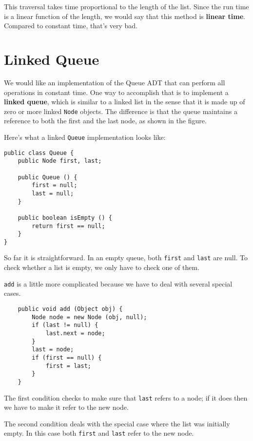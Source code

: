This traversal takes time proportional to the length of the
list.  Since the run time is a linear function of the length,
we would say that this method is {\bf linear time}.  Compared to
constant time, that's very bad. 



\section{Linked Queue}

We would like an implementation of the Queue ADT that can
perform all operations in constant time.  One way to
accomplish that is to implement a {\bf linked queue}, which
is similar to a linked list in the sense that it is made up
of zero or more linked {\tt Node} objects.  The difference
is that the queue
maintains a reference to both the first and the last node,
as shown in the figure.


Here's what a linked {\tt Queue} implementation looks like:

\begin{verbatim}
public class Queue {
    public Node first, last;

    public Queue () {
        first = null;
        last = null;
    }

    public boolean isEmpty () {
        return first == null;
    }
}
\end{verbatim}
%
So far it is straightforward.  In an empty queue, both {\tt first}
and {\tt last} are null.  To check whether a list is empty, we only
have to check one of them.

{\tt add} is a little more complicated because we have to
deal with several special cases.

\begin{verbatim}
    public void add (Object obj) {
        Node node = new Node (obj, null);
        if (last != null) {
            last.next = node;
        }
        last = node;
        if (first == null) {
            first = last;
        }
    }
\end{verbatim}
%
The first condition checks to make sure that {\tt last} refers
to a node; if it does then we have to make it refer to the new
node.

The second condition deals with the special case where the list
was initially empty.  In this case both {\tt first} and {\tt last}
refer to the new node.

